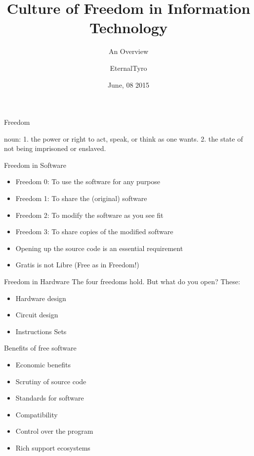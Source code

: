 \documentclass{beamer}
\title[Free Culture]{Culture of Freedom in Information Technology}
\subtitle[Overview]{An Overview}
\author[EternalTyro]{EternalTyro}
\institute[A]{
      Free Software Foundation, Tamil Nadu\\
      Summer Camp - 2015\\[1ex]
      \texttt{http://fsftn.org}
}
\date{June, 08 2015}
\begin{document}
\begin{frame}[plain]
  \titlepage
\end{frame}

\begin{frame}{Freedom}

\begin{definition}
 noun: 1. the power or right to act, speak, or think as one wants. 2. the state of not being imprisoned or enslaved.
\end{definition}
\end{frame}

\begin{frame}{Freedom in Software}
\begin{itemize}
 \item Freedom 0: To use the software for any purpose
 \pause
 \item Freedom 1: To share the (original) software 
 \pause
 \item Freedom 2: To modify the software as you see fit
 \pause
 \item Freedom 3: To share copies of the modified software
\end{itemize}
\begin{itemize}
 \item Opening up the source code is an essential requirement
 \pause
 \item Gratis is not Libre (Free as in Freedom!)
\end{itemize}
\end{frame}

\begin{frame}{Freedom in Hardware}
The four freedoms hold. But what do you open? These:
\begin{itemize}
 \item Hardware design 
 \item Circuit design
 \item Instructions Sets
\end{itemize}
\end{frame}

\begin{frame}{Benefits of free software}
\begin{itemize}
 \item Economic benefits
 \pause
 \item Scrutiny of source code
 \pause
 \item Standards for software
 \pause
 \item Compatibility 
 \pause
 \item Control over the program
 \pause
 \item Rich support ecosystems
\end{itemize}
\end{frame}
\end{document}
